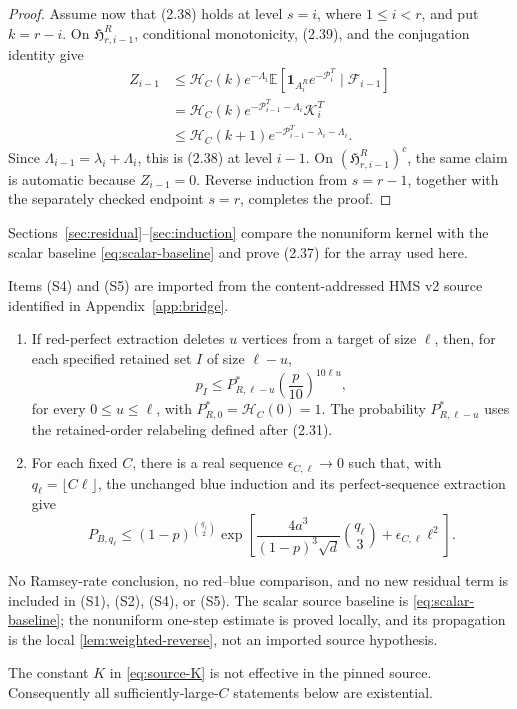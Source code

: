 \begin{proof}
Assume now that (2.38) holds at level \(s=i\), where \(1\le i<r\), and put
\(k=r-i\).  On \(\mathfrak H^R_{r,i-1}\), conditional monotonicity, (2.39),
and the conjugation identity give
\[
\begin{aligned}
 Z_{i-1}
 &\le \mathcal H_C(k)e^{-\Lambda_i}
 \mathbb E[\mathbf1_{A_i^R}e^{-\mathcal P_i^T}
            \mid\mathcal F_{i-1}]\\
 &=\mathcal H_C(k)e^{-\mathcal P_{i-1}^T-\Lambda_i}
   \mathcal K_i^T\\
 &\le\mathcal H_C(k+1)
 e^{-\mathcal P_{i-1}^T-\lambda_i-\Lambda_i}.
\end{aligned}
\]
Since \(\Lambda_{i-1}=\lambda_i+\Lambda_i\), this is (2.38) at level
\(i-1\).  On \((\mathfrak H^R_{r,i-1})^c\), the same claim is automatic
because \(Z_{i-1}=0\).  Reverse induction from \(s=r-1\), together with the
separately checked endpoint \(s=r\), completes the proof.
\end{proof}

Sections~\ref{sec:residual}--\ref{sec:induction} compare the nonuniform kernel with
the scalar baseline \eqref{eq:scalar-baseline} and prove (2.37) for the array
used here.

\begin{assumption}
\label{ass:hms-tail}
Items (S4) and (S5) are imported from the content-addressed HMS v2 source
identified in Appendix~\ref{app:bridge}.
\begin{enumerate}[label=(S\arabic*),start=4]
\item If red-perfect extraction deletes \(u\) vertices from a target of size
\(\ell\), then, for each specified retained set \(I\) of size \(\ell-u\),
\[
 p_I\le P^*_{R,\ell-u}\left(\frac p{10}\right)^{10\ell u},
\tag{2.41}
\]
for every \(0\le u\le\ell\), with
\(P^*_{R,0}=\mathcal H_C(0)=1\).  The probability \(P^*_{R,\ell-u}\)
uses the retained-order relabeling defined after (2.31).
\item For each fixed \(C\), there is a real sequence
\(\epsilon_{C,\ell}\to0\) such that, with
\(q_\ell=\lfloor C\ell\rfloor\), the unchanged blue induction and its
perfect-sequence extraction give
\[
 P_{B,q_\ell}\le(1-p)^{\binom{q_\ell}{2}}
 \exp\left[
 \frac{4a^3}{(1-p)^3\sqrt d}\binom{q_\ell}{3}
 +\epsilon_{C,\ell}\ell^2\right].
\tag{2.42}
\]
\end{enumerate}
No Ramsey-rate conclusion, no red--blue comparison, and no new residual term
is included in (S1), (S2), (S4), or (S5).  The scalar source baseline is
\eqref{eq:scalar-baseline}; the nonuniform one-step estimate is proved locally,
and its propagation is the local \cref{lem:weighted-reverse}, not an imported
source hypothesis.
\end{assumption}

The constant \(K\) in \eqref{eq:source-K} is not effective in the pinned source.
Consequently all sufficiently-large-\(C\) statements below are existential.
